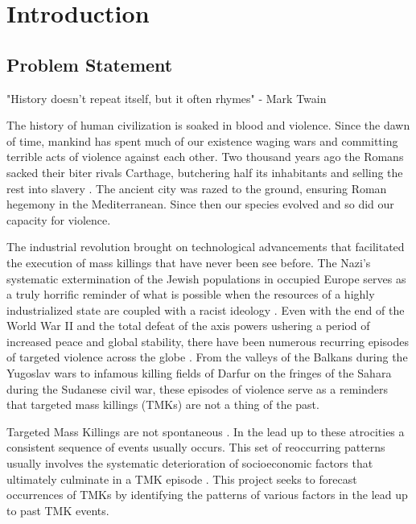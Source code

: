 \chapter{Introduction}\label{ch:intro}

\section{Problem Statement}
"History doesn't repeat itself, but it often rhymes" - Mark Twain

The history of human civilization is soaked in blood and violence. Since the dawn of time, mankind has spent much of our existence waging wars and committing terrible acts of violence against each other. Two thousand years ago the Romans sacked their biter rivals Carthage, butchering half its inhabitants and selling the rest into slavery \cite{carthgeae}. The ancient city was razed to the ground, ensuring Roman hegemony in the Mediterranean. Since then our species evolved and so did our capacity for violence.

The industrial revolution brought on technological advancements that facilitated the execution of mass killings that have never been see before. The Nazi's systematic extermination of the Jewish populations in occupied Europe serves as a truly horrific reminder of what is possible when the resources of a highly industrialized state are coupled with a racist ideology \cite{holocuast}. Even with the end of the World War II and the total defeat of the axis powers ushering a period of increased peace and global stability, there have been numerous recurring episodes of targeted violence across the globe \cite{genocideoccur}. From the valleys of the Balkans during the Yugoslav wars to infamous killing fields of Darfur on the fringes of the Sahara during the Sudanese civil war, these episodes of violence serve as a reminders that targeted mass killings (TMKs) are not a thing of the past. 

Targeted Mass Killings are not spontaneous \cite{JasonBea}. In the lead up to these atrocities a consistent sequence of events usually occurs. This set of reoccurring patterns usually involves the systematic deterioration of socioeconomic factors that ultimately culminate in a TMK episode \cite{Harff2003}. This project seeks to forecast occurrences of TMKs by identifying the patterns of various factors in the lead up to past TMK events.




